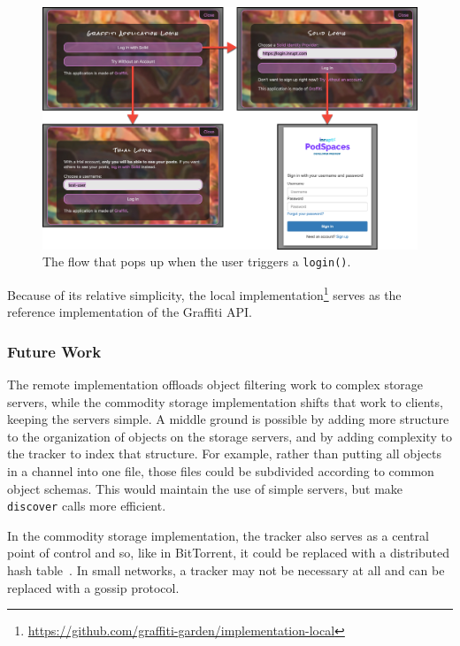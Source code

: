 \begin{figure}[ht]
    \includegraphics[width=\textwidth]{figures/login.jpg}
    \caption{The flow that pops up when the user triggers a \texttt{login()}.}
    \label{above-and-below:figure:login}
\end{figure}

Because of its relative simplicity, the local implementation\footnote{
    \url{https://github.com/graffiti-garden/implementation-local}
} serves as the reference implementation of the Graffiti API.


\subsubsection{Future Work}
\label{above-and-below:below:future-work}

The remote implementation offloads object filtering work to complex storage servers,
while the commodity storage implementation shifts that work to clients, keeping the servers simple.
A middle ground is possible by adding more structure to the organization of objects on
the storage servers, and by adding complexity to the tracker to index that structure.
For example, rather than putting all objects in a channel into one file,
those files could be subdivided according to common object schemas.
This would maintain the use of simple servers, but make \texttt{discover} calls more efficient.

In the commodity storage implementation, the tracker also serves as a central point of control and so, like in BitTorrent,
it could be replaced with a distributed hash table~\cite{bittorrentdht}. In small networks,
a tracker may not be necessary at all and can be replaced with a gossip protocol.

